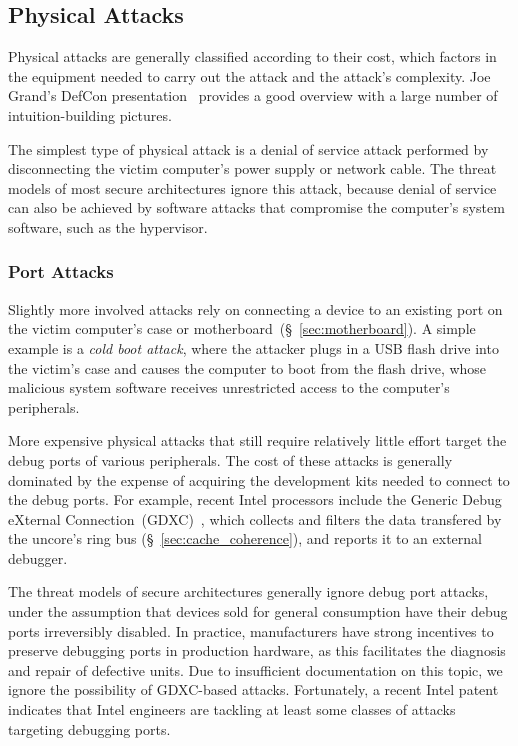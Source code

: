 \subsection{Physical Attacks}
\label{sec:physical_attacks}

Physical attacks are generally classified according to their cost, which
factors in the equipment needed to carry out the attack and the attack's
complexity. Joe Grand's DefCon presentation~\cite{grand2004physicalattacks}
provides a good overview with a large number of intuition-building pictures.

The simplest type of physical attack is a denial of service attack performed by
disconnecting the victim computer's power supply or network cable. The threat
models of most secure architectures ignore this attack, because denial of
service can also be achieved by software attacks that compromise the computer's
system software, such as the hypervisor.


\subsubsection{Port Attacks}
\label{sec:physical_port_attacks}

Slightly more involved attacks rely on connecting a device to an existing port
on the victim computer's case or motherboard~(\S~\ref{sec:motherboard}). A
simple example is a \textit{cold boot attack}, where the attacker plugs in a
USB flash drive into the victim's case and causes the computer to boot from
the flash drive, whose malicious system software receives unrestricted access
to the computer's peripherals.

More expensive physical attacks that still require relatively little effort
target the debug ports of various peripherals. The cost of these attacks is
generally dominated by the expense of acquiring the development kits needed to
connect to the debug ports. For example, recent Intel processors include the
Generic Debug eXternal Connection~(GDXC)~\cite{yuffe2011sandybridge,
intel2011gdxc}, which collects and filters the data transfered by the uncore's
ring bus (\S~\ref{sec:cache_coherence}), and reports it to an external
debugger.

The threat models of secure architectures generally ignore debug port attacks,
under the assumption that devices sold for general consumption have their debug
ports irreversibly disabled. In practice, manufacturers have strong incentives
to preserve debugging ports in production hardware, as this facilitates the
diagnosis and repair of defective units. Due to insufficient documentation on
this topic, we ignore the possibility of GDXC-based attacks. Fortunately, a
recent Intel patent~\cite{shanbhogue2015gdxcsgx} indicates that Intel engineers
are tackling at least some classes of attacks targeting debugging ports.


